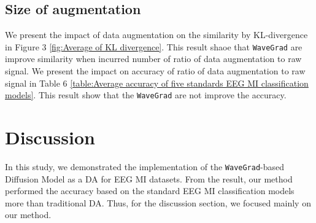 \documentclass[runningheads]{llncs}
\begin{document}
\begin{table}[ht] 
\centering
\caption{\label{table:Average accuracy of five standards EEG MI classification models} Average accuracy of five standards EEG MI classification models}
\end{table}

\subsection{Size of augmentation}
We present the impact of data augmentation on the similarity by KL-divergence in Figure 3 \ref{fig:Average of KL divergence}. This result shaoe that \texttt{WaveGrad} are improve similarity when incurred number of ratio of data augmentation to raw signal.
We present the impact on accuracy of ratio of data augmentation to raw signal  in Table 6 \ref{table:Average accuracy of five standards EEG MI classification models}. This result show that the \texttt{WaveGrad} are not improve the accuracy.




\section{Discussion}
In this study, we demonstrated the implementation of the \texttt{WaveGrad}-based Diffusion Model as a DA for EEG MI datasets. From the result, our method performed the accuracy based on the standard EEG MI classification models more than traditional DA. Thus, for the discussion section, we focused mainly on our method.
\end{document}
